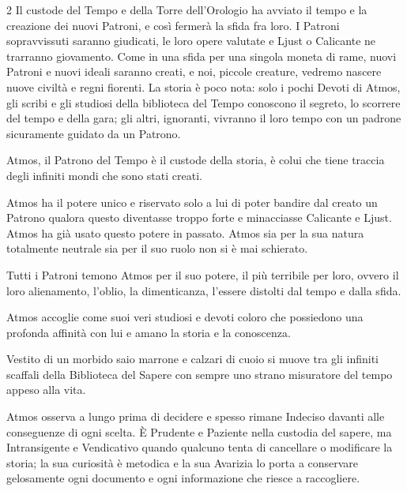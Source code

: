 \begin{multicols}{2}
Il custode del Tempo e della Torre dell'Orologio ha avviato il tempo e la creazione dei nuovi Patroni, e così fermerà la sfida fra loro. I Patroni sopravvissuti saranno giudicati, le loro opere valutate e Ljust o Calicante ne trarranno giovamento. Come in una sfida per una singola moneta di rame, nuovi Patroni e nuovi ideali saranno creati, e noi, piccole creature, vedremo nascere nuove civiltà e regni fiorenti. La storia è poco nota: solo i pochi Devoti di Atmos, gli scribi e gli studiosi della biblioteca del Tempo conoscono il segreto, lo scorrere del tempo e della gara; gli altri, ignoranti, vivranno il loro tempo con un padrone sicuramente guidato da un Patrono.

Atmos, il Patrono del Tempo è il custode della storia, è colui che tiene traccia degli infiniti mondi che sono stati creati.

Atmos ha il potere unico e riservato solo a lui di poter bandire dal creato un Patrono qualora questo diventasse troppo forte e minacciasse Calicante e Ljust. Atmos ha già usato questo potere in passato. Atmos sia per la sua natura totalmente neutrale sia per il suo ruolo non si è mai schierato.

Tutti i Patroni temono Atmos per il suo potere, il più terribile per loro, ovvero il loro alienamento, l'oblio, la dimenticanza, l'essere distolti dal tempo e dalla sfida.

Atmos accoglie come suoi veri studiosi e devoti coloro che possiedono una profonda affinità con lui e amano la storia e la conoscenza.

Vestito di un morbido saio marrone e calzari di cuoio si muove tra gli infiniti scaffali della Biblioteca del Sapere con sempre uno strano misuratore del tempo appeso alla vita.

Atmos osserva a lungo prima di decidere e spesso rimane Indeciso davanti alle conseguenze di ogni scelta. È Prudente e Paziente nella custodia del sapere, ma Intransigente e Vendicativo quando qualcuno tenta di cancellare o modificare la storia; la sua curiosità è metodica e la sua Avarizia lo porta a conservare gelosamente ogni documento e ogni informazione che riesce a raccogliere.



\end{multicols}

